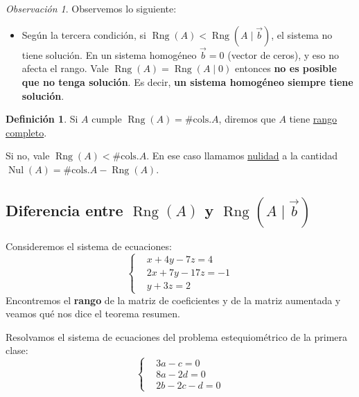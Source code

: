 \documentclass[12pt]{article}
\theoremstyle{plain}
\theoremstyle{definition}
\newtheorem*{Def}{Definición}       %
\theoremstyle{remark}
\newtheorem*{Rmk}{Observación}      %
\DeclareMathOperator{\Rng}{Rng}     %
\DeclareMathOperator{\Nul}{Nul}     %
\renewcommand{\:}{\colon}           %
\newcommand{\un}[1]{\underline{#1}}
\begin{document}
\begin{multicols}{2}
\begin{Rmk}
  Observemos lo siguiente:
  \begin{itemize}
    \item Según la tercera condición, si $\Rng(A)<\Rng(A\mid\vec b)$, el sistema no tiene solución. En un sistema homogéneo $\vec b=0$ (vector de ceros), y eso no afecta el rango. Vale $\Rng(A)=\Rng(A\mid 0)$ entonces \textbf{no es posible que no tenga solución}. Es decir, \textbf{un sistema homogéneo siempre tiene solución}.
  \end{itemize}
\end{Rmk}

\begin{Def}
  Si $A$ cumple  $\Rng(A)=\#\text{cols.} A$, diremos que $A$ tiene \un{rango completo}.\par 
  Si no, vale $\Rng(A)<\#\text{cols.} A$. En ese caso llamamos \un{nulidad} a la cantidad $\Nul(A)=\#\text{cols.} A-\Rng(A)$.
\end{Def}

\subsection*{Diferencia entre $\Rng(A)$ y $\Rng(A\mid\vec b)$}

\begin{ptcbP}
  Consideremos el sistema de ecuaciones:
  $$
\left\lbrace\begin{aligned}
  &x+4y-7z=4\\
  &2x+7y-17z=-1\\
  &y+3z=2
            \end{aligned}\right.
$$
Encontremos el \textbf{rango} de la matriz de coeficientes y de la matriz aumentada y veamos qué nos dice el teorema resumen.
\end{ptcbP}
\vspace{3cm}



\begin{ptcbP}
  Resolvamos el sistema de ecuaciones del problema estequiométrico de la primera clase:
  $$
  \left\lbrace\begin{aligned}
    &3a-c=0\\
    &8a-2d=0\\
    &2b-2c-d=0
              \end{aligned}\right.
  $$
\end{ptcbP}
\vspace{5cm}


\end{multicols}
\end{document}

